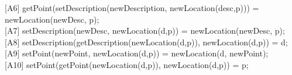 \documentclass[12pt]{article}
\begin{document}
\begin{spacing}{1.5}
\hspace*{5mm} [A6] getPoint(setDescription(newDescription, newLocation(desc,p))) = newLocation(newDesc, p);\\
\hspace*{5mm} [A7] setDescription(newDesc, newLocation(d,p)) = newLocation(newDesc, p);\\
\hspace*{5mm} [A8] setDescription(getDescription(newLocation(d,p)), newLocation(d,p)) = d;\\
\hspace*{5mm} [A9] setPoint(newPoint, newLocation(d,p)) = newLocation(d, newPoint);\\
\hspace*{5mm} [A10] setPoint(getPoint(newLocation(d,p)), newLocation(d,p)) = p;\\




\end{spacing}
\end{document}
